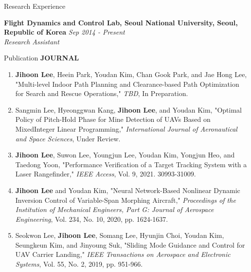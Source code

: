 \documentclass{resume}
\begin{document}
\begin{rSection}{Research Experience}

{\bf Flight Dynamics and Control Lab, Seoul National University, Seoul, Republic of Korea} \hfill {\em Sep 2014 - Present} 
\\{\textit{Research Assistant}}

\end{rSection}

\begin{rSection}{Publication}
	\textbf{JOURNAL}
	\begin{enumerate}\renewcommand{\labelenumi}{[J\theenumi]}
		\item \textbf{Jihoon Lee}, Heein Park, Youdan Kim, Chan Gook Park, and Jae Hong Lee, "Multi-level Indoor Path Planning and Clearance-based Path Optimization for Search and Rescue Operations," \textit{TBD}, In Preparation.
		
		\item Sangmin Lee, Hyeonggwan Kang, \textbf{Jihoon Lee}, and Youdan Kim, "Optimal Policy of Pitch-Hold Phase for Mine Detection of UAVs Based on MixedInteger Linear Programming," \textit{International Journal of Aeronautical and Space Sciences}, Under Review.
		
		\item \textbf{Jihoon Lee}, Suwon Lee, Youngjun Lee, Youdan Kim, Yongjun Heo, and Taedong Yoon, "Performance Veriﬁcation of a Target Tracking System with a Laser Rangeﬁnder," \textit{IEEE Access}, Vol. 9, 2021. 30993-31009.  
		
		\item \textbf{Jihoon Lee} and Youdan Kim, "Neural Network-Based Nonlinear Dynamic Inversion Control of Variable-Span Morphing Aircraft," \textit{Proceedings of the Institution of Mechanical Engineers, Part G: Journal of Aerospace Engineering}, Vol. 234, No. 10, 2020, pp. 1624-1637. \newline[DOI: 10.1177/0954410019846713]
		
		\item Seokwon Lee, \textbf{Jihoon Lee}, Somang Lee, Hyunjin Choi, Youdan Kim, Seungkeun Kim, and Jinyoung Suk, "Sliding Mode Guidance and Control for UAV Carrier Landing," \textit{IEEE Transactions on Aerospace and Electronic Systems}, Vol. 55, No. 2, 2019, pp. 951-966. 
	\end{enumerate}\renewcommand{\labelenumi}{\theenumi.}
	

\end{rSection}
\end{document}
